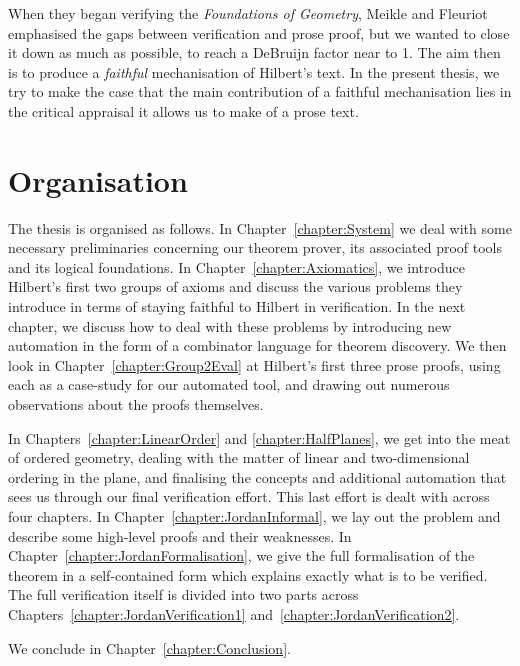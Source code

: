 When they began verifying the \emph{Foundations of Geometry}, Meikle and Fleuriot~\cite{MeikleFleuriotFormalizingHilbert} emphasised the gaps between verification and prose proof, but we wanted to close it down as much as possible, to reach a DeBruijn factor near to 1. The aim then is to produce a \emph{faithful} mechanisation of Hilbert's text. In the present thesis, we try to make the case that the main contribution of a faithful mechanisation lies in the critical appraisal it allows us to make of a prose text.

\section{Organisation}
The thesis is organised as follows. In Chapter~\ref{chapter:System} we deal with some necessary preliminaries concerning our theorem prover, its associated proof tools and its logical foundations. In Chapter~\ref{chapter:Axiomatics}, we introduce Hilbert's first two groups of axioms and discuss the various problems they introduce in terms of staying faithful to Hilbert in verification. In the next chapter, we discuss how to deal with these problems by introducing new automation in the form of a combinator language for theorem discovery. We then look in Chapter~\ref{chapter:Group2Eval} at Hilbert's first three prose proofs, using each as a case-study for our automated tool, and drawing out numerous observations about the proofs themselves. 

In Chapters~\ref{chapter:LinearOrder} and \ref{chapter:HalfPlanes}, we get into the meat of ordered geometry, dealing with the matter of linear and two-dimensional ordering in the plane, and finalising the concepts and additional automation that sees us through our final verification effort. This last effort is dealt with across four chapters. In Chapter~\ref{chapter:JordanInformal}, we lay out the problem and describe some high-level proofs and their weaknesses. In Chapter~\ref{chapter:JordanFormalisation}, we give the full formalisation of the theorem in a self-contained form which explains exactly what is to be verified. The full verification itself is divided into two parts across Chapters~\ref{chapter:JordanVerification1} and~\ref{chapter:JordanVerification2}.

We conclude in Chapter~\ref{chapter:Conclusion}. 

